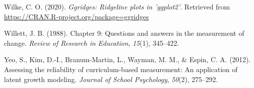 \documentclass[
  english,
  man, fleqn, noextraspace]{apa6}
\begin{document}
\leavevmode\hypertarget{ref-ggridges}{}%
Wilke, C. O. (2020). \emph{Ggridges: Ridgeline plots in 'ggplot2'}. Retrieved from \url{https://CRAN.R-project.org/package=ggridges}

\leavevmode\hypertarget{ref-willett1988chapter}{}%
Willett, J. B. (1988). Chapter 9: Questions and answers in the measurement of change. \emph{Review of Research in Education}, \emph{15}(1), 345--422.

\leavevmode\hypertarget{ref-yeoetal2012}{}%
Yeo, S., Kim, D.-I., Branum-Martin, L., Wayman, M. M., \& Espin, C. A. (2012). Assessing the reliability of curriculum-based measurement: An application of latent growth modeling. \emph{Journal of School Psychology}, \emph{50}(2), 275--292.

\endgroup
\end{document}
